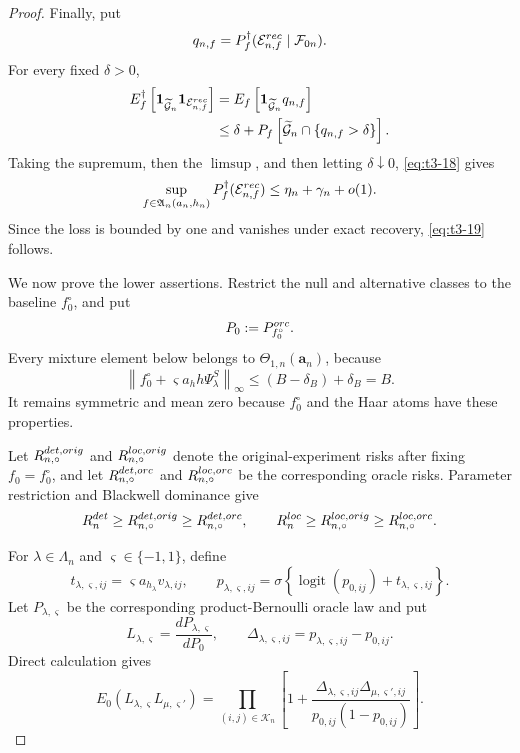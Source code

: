 \documentclass[10pt,a4paper]{amsart}
\begin{document}
\begin{proof}
Finally, put
\[
q_{n,f}
=
P_f^\dagger
(\mathcal E_{n,f}^{\rm rec}\mid\mathcal F_{0n}).
\]
For every fixed \(\delta>0\),
\begin{align*}
E_f^\dagger
\left[
\mathbf 1_{\widetilde{\mathcal G}_n}
\mathbf 1_{\mathcal E_{n,f}^{\rm rec}}
\right]
&=
E_f\left[
\mathbf 1_{\widetilde{\mathcal G}_n}q_{n,f}
\right]\\
&\le
\delta
+
P_f\left[
\widetilde{\mathcal G}_n
\cap
\{q_{n,f}>\delta\}
\right].
\end{align*}
Taking the supremum, then the \(\limsup\), and then letting
\(\delta\downarrow0\), \eqref{eq:t3-18} gives
\[
\sup_{f\in\mathfrak A_n(a_n,h_n)}
P_f^\dagger(\mathcal E_{n,f}^{\rm rec})
\le
\eta_n+\gamma_n+o(1).
\]
Since the loss is bounded by one and vanishes under exact recovery,
\eqref{eq:t3-19} follows.

We now prove the lower assertions.  Restrict the null and alternative
classes to the baseline \(f_0^\circ\), and put
\[
P_0:=P_{f_0^\circ}^{\rm orc}.
\]
Every mixture element below belongs to
\(\Theta_{1,n}(\mathbf a_n)\), because
\[
\left\|
f_0^\circ+\varsigma a_h h\Psi_\lambda^S
\right\|_\infty
\le
(B-\delta_B)+\delta_B
=
B.
\]
It remains symmetric and mean zero because \(f_0^\circ\) and the Haar
atoms have these properties.

Let \(R_{n,\circ}^{\rm det,orig}\) and
\(R_{n,\circ}^{\rm loc,orig}\) denote the original-experiment risks
after fixing \(f_0=f_0^\circ\), and let
\(R_{n,\circ}^{\rm det,orc}\) and
\(R_{n,\circ}^{\rm loc,orc}\) be the corresponding oracle risks.
Parameter restriction and Blackwell dominance give
\[
R_n^{\rm det}
\ge
R_{n,\circ}^{\rm det,orig}
\ge
R_{n,\circ}^{\rm det,orc},
\qquad
R_n^{\rm loc}
\ge
R_{n,\circ}^{\rm loc,orig}
\ge
R_{n,\circ}^{\rm loc,orc}.
\]

For \(\lambda\in\Lambda_n\) and
\(\varsigma\in\{-1,1\}\), define
\[
t_{\lambda,\varsigma,ij}
=
\varsigma a_{h_\lambda}v_{\lambda,ij},
\qquad
p_{\lambda,\varsigma,ij}
=
\sigma\left\{
\operatorname{logit}(p_{0,ij})
+
t_{\lambda,\varsigma,ij}
\right\}.
\]
Let \(P_{\lambda,\varsigma}\) be the corresponding product-Bernoulli
oracle law and put
\[
L_{\lambda,\varsigma}
=
\frac{dP_{\lambda,\varsigma}}{dP_0},
\qquad
\Delta_{\lambda,\varsigma,ij}
=
p_{\lambda,\varsigma,ij}-p_{0,ij}.
\]
Direct calculation gives
\begin{equation}
E_0
(L_{\lambda,\varsigma}L_{\mu,\varsigma'})
=
\prod_{(i,j)\in\mathcal K_n}
\left[
1+
\frac{
\Delta_{\lambda,\varsigma,ij}
\Delta_{\mu,\varsigma',ij}
}{
p_{0,ij}(1-p_{0,ij})
}
\right].
\label{eq:t3-37}
\end{equation}


\end{proof}
\end{document}
